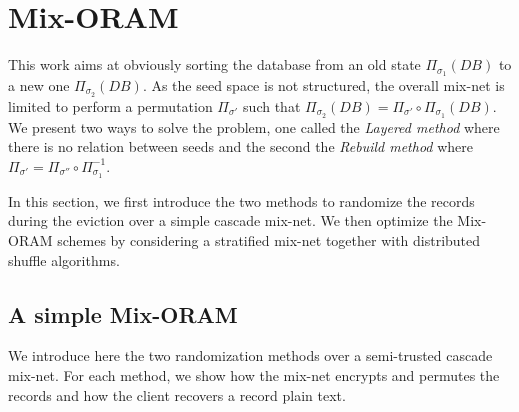\documentclass{llncs}
\begin{document}
\section{Mix-ORAM}\label{Mix-ORAM}
This work aims at obviously sorting the database from an old state $\Pi_{\sigma_1}(DB)$ to a new one $\Pi_{\sigma_2}(DB)$. As the seed space is not structured, the overall mix-net is limited to perform a permutation $\Pi_{\sigma'}$ such that $\Pi_{\sigma_2}(DB) = \Pi_{\sigma'} \circ \Pi_{\sigma_1} (DB)$. We present two ways to solve the problem, one called the \emph{Layered method} where there is no relation between seeds and the second the \emph{Rebuild method} where $\Pi_{\sigma'} = \Pi_{\sigma''} \circ \Pi_{\sigma_1}^{-1}$. 

In this section, we first introduce the two methods to randomize the records during the eviction over a simple cascade mix-net. We then optimize the Mix-ORAM schemes by considering a stratified mix-net together with distributed shuffle algorithms.

\subsection{A simple Mix-ORAM}\label{ASMO}
We introduce here the two randomization methods over a semi-trusted cascade mix-net. For each method, we show how the mix-net encrypts and permutes the records and how the client recovers a record plain text.
\end{document}
